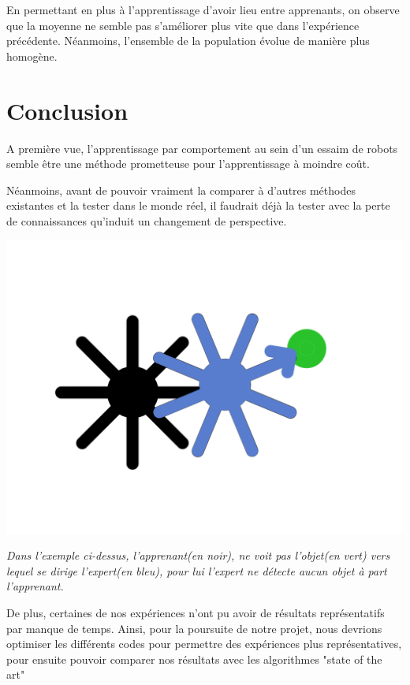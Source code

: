 \documentclass[a4paper, 12pt]{report}
\begin{document}
	En permettant en plus à l'apprentissage d'avoir lieu entre apprenants, on observe que la moyenne ne semble pas s'améliorer plus vite que dans l'expérience précédente. Néanmoins, l'ensemble de la population évolue de manière plus homogène.


\chapter{Conclusion}

A première vue, l'apprentissage par comportement au sein d'un essaim de robots semble être une méthode prometteuse pour l'apprentissage à moindre coût.

Néanmoins, avant de pouvoir vraiment la comparer à d'autres méthodes existantes et la tester dans le monde réel, il faudrait déjà la tester avec la perte de connaissances qu'induit un changement de perspective.
\begin{center}
	\includegraphics[scale = 0.5]{scheme.png}
\end{center}
\textit{Dans l'exemple ci-dessus, l'apprenant(en noir), ne voit pas l'objet(en vert) vers lequel se dirige l'expert(en bleu), pour lui l'expert ne détecte aucun objet à part l'apprenant.}

De plus, certaines de nos expériences n'ont pu avoir de résultats représentatifs par manque de temps. Ainsi, pour la poursuite de notre projet, nous devrions optimiser les différents codes pour permettre des expériences plus représentatives, pour ensuite pouvoir comparer nos résultats avec les algorithmes "state of the art"

    \appendix
\end{document}
